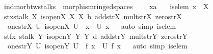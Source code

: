 \documentclass[12pt]{scrartcl}
\begin{document}
\begin{isabelle}
\isamarkupfalse%
\ ind{\isacharunderscore}{\kern0pt}mor{\isacharunderscore}{\kern0pt}btw{\isacharunderscore}{\kern0pt}stalks\ {\isacharequal}{\kern0pt}\ morphism{\isacharunderscore}{\kern0pt}ringed{\isacharunderscore}{\kern0pt}spaces\ {\isacharplus}{\kern0pt}\isanewline
\ \ \ x{\isacharcolon}{\kern0pt}{\isacharcolon}{\kern0pt}{\isachardoublequoteopen}{\isacharprime}{\kern0pt}a{\isachardoublequoteclose}\isanewline
\ \ \ is{\isacharunderscore}{\kern0pt}elem{\isacharcolon}{\kern0pt}\ {\isachardoublequoteopen}x\ {\isasymin}\ X{\isachardoublequoteclose}\isanewline
{}\isanewline
\isanewline
{}\isamarkupfalse%
\ stx{\isacharcolon}{\kern0pt}stalk\ X\ is{\isacharunderscore}{\kern0pt}open\isactrlsub X\ {\isasymO}\isactrlsub X\ {\isasymrho}\isactrlsub X\ b\ add{\isacharunderscore}{\kern0pt}str\isactrlsub X\ mult{\isacharunderscore}{\kern0pt}str\isactrlsub X\ zero{\isacharunderscore}{\kern0pt}str\isactrlsub X\ \isanewline
\ \ one{\isacharunderscore}{\kern0pt}str\isactrlsub X\ {\isachardoublequoteopen}{\isacharbraceleft}{\kern0pt}U{\isachardot}{\kern0pt}\ is{\isacharunderscore}{\kern0pt}open\isactrlsub X\ U\ {\isasymand}\ x\ {\isasymin}\ U{\isacharbraceright}{\kern0pt}{\isachardoublequoteclose}\ {\isachardoublequoteopen}x{\isachardoublequoteclose}\isanewline
{}\isamarkupfalse%
\ \isamarkupfalse%
\ {\isacharparenleft}{\kern0pt}auto\ simp{\isacharcolon}{\kern0pt}\ is{\isacharunderscore}{\kern0pt}elem{\isacharparenright}{\kern0pt}%
\isanewline
\isanewline
{}\isamarkupfalse%
\ stfx{\isacharcolon}{\kern0pt}\ stalk\ Y\ is{\isacharunderscore}{\kern0pt}open\isactrlsub Y\ {\isasymO}\isactrlsub Y\ {\isasymrho}\isactrlsub Y\ d\ add{\isacharunderscore}{\kern0pt}str\isactrlsub Y\ mult{\isacharunderscore}{\kern0pt}str\isactrlsub Y\ zero{\isacharunderscore}{\kern0pt}str\isactrlsub Y\ \isanewline
\ \ one{\isacharunderscore}{\kern0pt}str\isactrlsub Y\ {\isachardoublequoteopen}{\isacharbraceleft}{\kern0pt}U{\isachardot}{\kern0pt}\ is{\isacharunderscore}{\kern0pt}open\isactrlsub Y\ U\ {\isasymand}\ {\isacharparenleft}{\kern0pt}f\ x{\isacharparenright}{\kern0pt}\ {\isasymin}\ U{\isacharbraceright}{\kern0pt}{\isachardoublequoteclose}\ {\isachardoublequoteopen}f\ x{\isachardoublequoteclose}\isanewline
{}\isamarkupfalse%
\ \isamarkupfalse%
\ {\isacharparenleft}{\kern0pt}auto\ simp{\isacharcolon}{\kern0pt}\ is{\isacharunderscore}{\kern0pt}elem{\isacharparenright}{\kern0pt}%

\end{isabelle}
\end{document}
